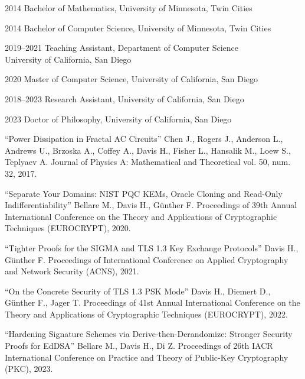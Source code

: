 \documentclass[11pt]{ucsddissertation}
\begin{document}
\begin{vita}
\noindent
\begin{cv}{}
\begin{cvlist}{}
\item[2014] Bachelor of Mathematics, University of Minnesota, Twin Cities
\item[2014] Bachelor of Computer Science, University of Minnesota, Twin Cities 
\item[2019--2021] Teaching Assistant, Department of Computer Science\\University of California, San Diego
\item[2020] Master of Computer Science, University of California, San Diego
\item[2018--2023] Research Assistant, University of California, San
Diego
\item[2023] Doctor of Philosophy, University of California, San Diego
\end{cvlist}
\end{cv}

\publications
\noindent ``Power Dissipation in Fractal AC Circuits'' Chen J., Rogers J., Anderson L., Andrews U.,
Brzoska A., Coffey A., Davis H., Fisher L., Hansalik M., Loew S., Teplyaev A. Journal of
Physics A: Mathematical and Theoretical vol. 50, num. 32, 2017.

\noindent ``Separate Your Domains: NIST PQC KEMs, Oracle Cloning and Read-Only Indifferentiability'' Bellare M., Davis
H., G{\"{u}}nther F. Proceedings of 39th Annual International Conference on the Theory and Applications of Cryptographic
Techniques (EUROCRYPT), 2020.

\noindent ``Tighter Proofs for the SIGMA and TLS 1.3 Key Exchange Protocols'' Davis H., G{\"{u}}nther F.
Proceedings of International Conference on Applied Cryptography and Network Security (ACNS), 2021.

\noindent ``On the Concrete Security of {TLS} 1.3 {PSK} Mode'' Davis H., Diemert D., G{\"{u}}nther F., Jager T.
Proceedings of 41st Annual International
Conference on the Theory and Applications of Cryptographic Techniques (EUROCRYPT), 2022.

\noindent ``Hardening Signature Schemes via Derive-then-Derandomize: Stronger
Security Proofs for EdDSA'' Bellare M., Davis H., Di Z. Proceedings of 26th {IACR} International Conference
on Practice and Theory of Public-Key Cryptography (PKC), 2023.


\end{vita}
\end{document}
